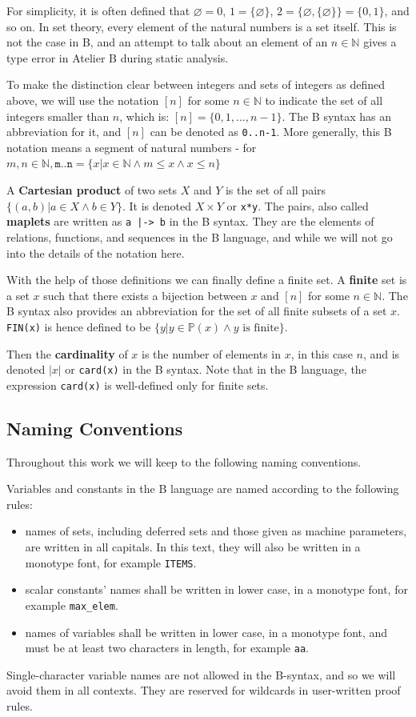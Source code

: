 \documentclass[12pt,journal,duplex]{IEEEtran}
\begin{document}
	For simplicity, it is often defined that $\varnothing = 0$, $1 = \{\varnothing \}$, $2 = \{\varnothing , \{\varnothing\} \} = \{0,1\}$, and so on. In set theory, every element of the natural numbers is a set itself. This is not the case in B, and an attempt to talk about an element of an $n \in \mathbb{N}$ gives a type error in Atelier B during static analysis.

	To make the distinction clear between integers and sets of integers as defined above, we will use the notation $[n]$ for some $n \in \mathbb{N}$ to indicate the set of all integers smaller than $n$, which is: $[n] = \{0,1, ...,n-1\}$. The B syntax has an abbreviation for it, and $[n]$ can be denoted as \texttt{0..n-1}. More generally, this B notation means a segment of natural numbers - for $m, n \in \mathbb{N}, \texttt{m..n} = \{x | x \in \mathbb{N} \wedge m \leq x \wedge x \leq n\}$

	A \textbf{Cartesian product} of two sets $X$ and $Y$ is the set of all pairs $\{(a,b) | a \in X \wedge b \in Y  \}$. It is denoted $X \times Y$ or \texttt{x*y}. The pairs, also called \textbf{maplets} are written as \texttt{a~|->~b} in the B syntax. They are the elements of relations, functions, and sequences in the B language, and while we will not go into the details of the notation here.

	With the help of those definitions we can finally define a finite set. A \textbf{finite} set is a set $x$ such that there exists a bijection between $x$ and $[n]$ for some $n \in \mathbb{N}$.  The B syntax also provides an abbreviation for the set of all finite subsets of a set $x$. \texttt{FIN(x)} is hence defined to be $\{y| y \in \mathbb{P}(x) \wedge y \text{ is finite} \}$.

	Then the \textbf{cardinality} of $x$ is the number of elements in $x$, in this case $n$, and is denoted $|x|$ or \texttt{card(x)} in the B syntax. Note that in the B language, the expression \texttt{card(x)} is well-defined only for finite sets.

	\subsection{Naming Conventions}
	Throughout this work we will keep to the following naming conventions.

	Variables and constants in the B language are named according to the following rules:
	\begin{itemize}
		\item names of sets, including deferred sets and those given as machine parameters, are written in all capitals. In this text, they will also be written in a monotype font, for example \texttt{ITEMS}.
		\item scalar constants' names shall be written in lower case, in a monotype font, for example \texttt{max\_elem}.
		\item names of variables shall be written in lower case, in a monotype font, and must be at least two characters in length, for example \texttt{aa}.
	\end{itemize}
	Single-character variable names are not allowed in the B-syntax, and so we will avoid them in all contexts. They are reserved for wildcards in user-written proof rules.
\end{document}
